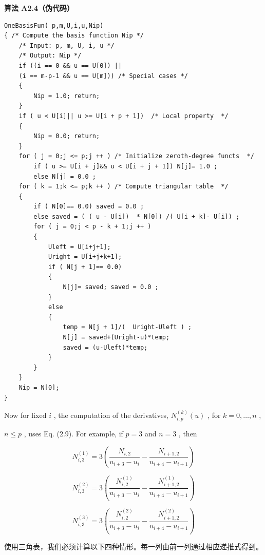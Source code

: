 \documentclass[../main.tex]{subfiles}
\begin{document}
\par\medskip\noindent\textbf{算法 A2.4（伪代码）}\par
\begin{verbatim}
OneBasisFun( p,m,U,i,u,Nip)
{ /* Compute the basis function Nip */
    /* Input: p, m, U, i, u */
    /* Output: Nip */
    if ((i == 0 && u == U[0]) ||
    (i == m-p-1 && u == U[m])) /* Special cases */
    {
        Nip = 1.0; return;
    }
    if ( u < U[i]|| u >= U[i + p + 1])  /* Local property  */
    {
        Nip = 0.0; return;
    }
    for ( j = 0;j <= p;j ++ ) /* Initialize zeroth-degree functs  */
        if ( u >= U[i + j]&& u < U[i + j + 1]) N[j]= 1.0 ;
        else N[j] = 0.0 ;
    for ( k = 1;k <= p;k ++ ) /* Compute triangular table  */
    {
        if ( N[0]== 0.0) saved = 0.0 ;
        else saved = ( ( u - U[i])  * N[0]) /( U[i + k]- U[i]) ;
        for ( j = 0;j < p - k + 1;j ++ )
        {
            Uleft = U[i+j+1];
            Uright = U[i+j+k+1];
            if ( N[j + 1]== 0.0)
            {
                N[j]= saved; saved = 0.0 ;
            }
            else
            {
                temp = N[j + 1]/(  Uright-Uleft ) ;
                N[j] = saved+(Uright-u)*temp;
                saved = (u-Uleft)*temp;
            }
        }
    }
    Nip = N[0];
}
\end{verbatim}

\hspace*{1em} Now for fixed \(i\) , the computation of the derivatives, \({N}_{i,p}^{\left( k\right) }\left( u\right)\) , for \(k = 0,\ldots ,n\) ,

\(n \leq  p\) , uses Eq. (2.9). For example, if \(p = 3\) and \(n = 3\) , then

\[
{N}_{i,3}^{\left( 1\right) } = 3\left( {\frac{{N}_{i,2}}{{u}_{i + 3} - {u}_{i}} - \frac{{N}_{i + 1,2}}{{u}_{i + 4} - {u}_{i + 1}}}\right)
\]

\[
{N}_{i,3}^{\left( 2\right) } = 3\left( {\frac{{N}_{i,2}^{\left( 1\right) }}{{u}_{i + 3} - {u}_{i}} - \frac{{N}_{i + 1,2}^{\left( 1\right) }}{{u}_{i + 4} - {u}_{i + 1}}}\right)
\]

\[
{N}_{i,3}^{\left( 3\right) } = 3\left( {\frac{{N}_{i,2}^{\left( 2\right) }}{{u}_{i + 3} - {u}_{i}} - \frac{{N}_{i + 1,2}^{\left( 2\right) }}{{u}_{i + 4} - {u}_{i + 1}}}\right)
\]

使用三角表，我们必须计算以下四种情形。每一列由前一列通过相应递推式得到。
\end{document}
